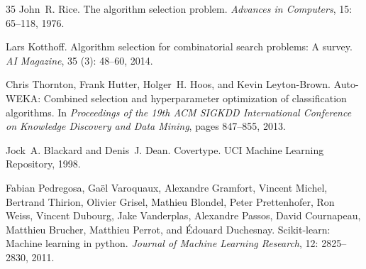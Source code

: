 \documentclass[12pt]{article}
\begin{document}
\begin{thebibliography}{35}
John~R. Rice.
\newblock The algorithm selection problem.
\newblock \emph{Advances in Computers}, 15: 65--118, 1976.

Lars Kotthoff.
\newblock Algorithm selection for combinatorial search problems: A survey.
\newblock \emph{AI Magazine}, 35 (3): 48--60, 2014.

Chris Thornton, Frank Hutter, Holger~H. Hoos, and Kevin Leyton-Brown.
\newblock Auto-WEKA: Combined selection and hyperparameter optimization of
  classification algorithms.
\newblock In \emph{Proceedings of the 19th ACM SIGKDD International Conference
  on Knowledge Discovery and Data Mining}, pages 847--855, 2013.

Jock~A. Blackard and Denis~J. Dean.
\newblock Covertype.
\newblock UCI Machine Learning Repository, 1998.

Fabian Pedregosa, Ga{\"e}l Varoquaux, Alexandre Gramfort, Vincent Michel,
  Bertrand Thirion, Olivier Grisel, Mathieu Blondel, Peter Prettenhofer, Ron
  Weiss, Vincent Dubourg, Jake Vanderplas, Alexandre Passos, David Cournapeau,
  Matthieu Brucher, Matthieu Perrot, and {\'E}douard Duchesnay.
\newblock Scikit-learn: Machine learning in python.
\newblock \emph{Journal of Machine Learning Research}, 12: 2825--2830,
  2011.

\end{thebibliography}
\end{document}
